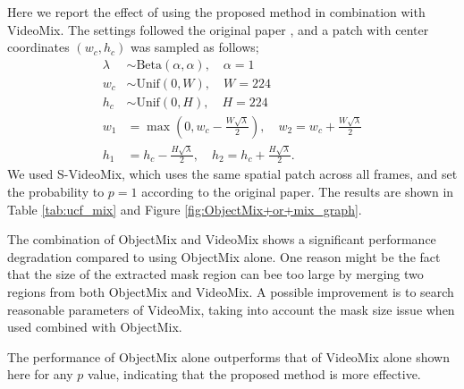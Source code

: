 Here we report the effect of using the proposed method in combination with VideoMix.
The settings followed the original paper \cite{VideoMix},
and a patch with center coordinates $(w_c, h_c)$ was sampled as follows;
\begin{align}
    \lambda &\sim \mathrm{Beta}(\alpha, \alpha), \quad \alpha = 1\\
    w_c &\sim \mathrm{Unif}(0, W), \quad W = 224 \\
    h_c &\sim \mathrm{Unif}(0, H), \quad H = 224 \\
    w_1 &= \max\left(0, w_c - \frac{W\sqrt{\lambda}}{2}\right), \quad
    w_2 = w_c + \frac{W\sqrt{\lambda}}{2} \\
    h_1 &= h_c - \frac{H\sqrt{\lambda}}{2}, \quad
    h_2 = h_c + \frac{H\sqrt{\lambda}}{2}.
\end{align}
We used S-VideoMix, which uses the same spatial patch across all frames,
and set the probability to $p=1$ according to the original paper.
The results are shown in Table \ref{tab:ucf_mix} and Figure \ref{fig:ObjectMix+or+mix_graph}.


The combination of ObjectMix and VideoMix shows a significant performance degradation compared to using ObjectMix alone.
One reason might be the fact that the size of the extracted mask region can bee too large by merging two regions from both ObjectMix and VideoMix.
A possible improvement is to search reasonable parameters of VideoMix, taking into account the mask size issue when used combined with ObjectMix. 

The performance of ObjectMix alone outperforms that of VideoMix alone shown here for any $p$ value,
indicating that the proposed method is more effective.








